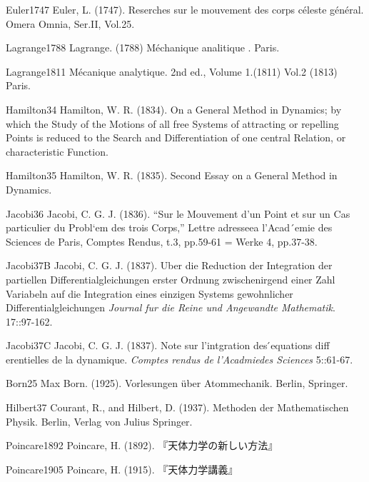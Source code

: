 \documentclass[uplatex,dvipdfmx]{jsreport}
\begin{document}
\begin{thebibliography}{99}
    \item{Euler1747}
    Euler, L. (1747). Reserches sur le mouvement des corps céleste général. Omera Omnia, Ser.II, Vol.25.
    \item{Lagrange1788}
    Lagrange. (1788) Méchanique analitique . Paris.
    \item{Lagrange1811}
    Mécanique analytique. 2nd ed., Volume 1.(1811) Vol.2 (1813) Paris.
    \item{Hamilton34}
    Hamilton, W. R. (1834). On a General Method in Dynamics; by which the Study of the Motions of all
    free Systems of attracting or repelling Points is reduced to the Search and Differentiation
    of one central Relation, or characteristic Function.
    \item{Hamilton35}
    Hamilton, W. R. (1835). Second Essay on a General Method in Dynamics.
    \item{Jacobi36}
    Jacobi, C. G. J. (1836).
    “Sur le Mouvement d’un Point et sur un Cas particulier du Probl`em des trois Corps,” Lettre adresseea l’Acad´emie des Sciences de Paris, Comptes Rendus, t.3, pp.59-61 = Werke 4, pp.37-38.
    \item{Jacobi37B}
    Jacobi, C. G. J. (1837). Uber die Reduction der Integration der partiellen Differentialgleichungen erster Ordnung zwischenirgend einer Zahl Variabeln auf die Integration eines einzigen Systems gewohnlicher Differentialgleichungen \textit{Journal fur die Reine und Angewandte Mathematik}. 17::97-162.
    \item{Jacobi37C}
    Jacobi, C. G. J. (1837). Note sur l’intgration des ́equations diff erentielles de la dynamique. \textit{Comptes rendus de l’Acadmiedes Sciences} 5::61-67.
    \item{Born25}
    Max Born. (1925). Vorlesungen über Atommechanik. Berlin, Springer.
    \item{Hilbert37}
    Courant, R., and Hilbert, D. (1937). Methoden der Mathematischen Physik. Berlin, Verlag von Julius Springer.
    \item{Poincare1892}
    Poincare, H. (1892). 『天体力学の新しい方法』
    \item{Poincare1905}
    Poincare, H. (1915). 『天体力学講義』
\end{thebibliography}
\end{document}

